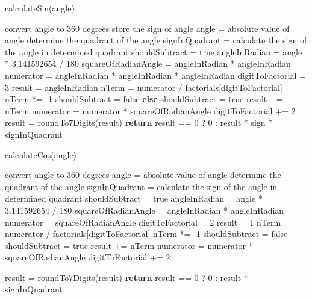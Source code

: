 \documentclass[paper=a4, fontsize=11pt,twoside]{scrartcl}	%
\begin{document}
\begin{algorithm}[H]
	\caption{calculateSin(angle)} 
	\begin{algorithmic}[1]
		\State convert angle to 360 degrees
		    \State store the sign of angle
		    \State angle = absolute value of angle
		\EndIf
		\State determine the quadrant of the angle
		\State signInQuadrant = calculate the sign of the angle in determined quadrant
		\State shouldSubtract = true
		\State angleInRadian = angle * 3.141592654 / 180
		\State squareOfRadianAngle = angleInRadian * angleInRadian
		\State numerator = angleInRadian * angleInRadian * angleInRadian
		\State digitToFactorial = 3
		\State result = angleInRadian
         \State nTerm = numerator / factorials[digitToFactorial]
            \State nTerm *= -1
            \State shouldSubtract = false
            \State \textbf{else}
            \State shouldSubtract = true
        \EndIf
        \State result += nTerm
        \State numerator = numerator * squareOfRadianAngle
        digitToFactorial += 2
        \EndFor
        \State result = roundTo7Digits(result)
        \State \textbf{return} result == 0 ? 0 : result * sign * signInQuadrant
	\end{algorithmic} 
\end{algorithm}

\begin{algorithm}[H]
	\caption{calculateCos(angle)} 
	\begin{algorithmic}[1]
        \State convert angle to 360 degrees
            \State angle = absolute value of angle
        \EndIf
        \State determine the quadrant of the angle
		\State signInQuadrant = calculate the sign of the angle in determined quadrant
        \State shouldSubtract = true
        \State angleInRadian = angle * 3.141592654 / 180
        \State squareOfRadianAngle = angleInRadian * angleInRadian
        \State numerator = squareOfRadianAngle
        \State digitToFactorial = 2
        \State result = 1
            \State nTerm = numerator / factorials[digitToFactorial]
                \State nTerm *= -1
                \State shouldSubtract = false
            \State \Else
                \State shouldSubtract = true
            \EndIf
            \State result += nTerm
            \State numerator = numerator * squareOfRadianAngle
            \State digitToFactorial += 2
        \EndFor

        \State result = roundTo7Digits(result)
        \State \textbf{return} result == 0 ? 0 : result * signInQuadrant
	\end{algorithmic} 
\end{algorithm}
\end{document}
